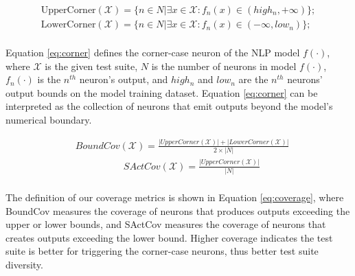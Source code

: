 \begin{equation}
\begin{split}
    \text{UpperCorner}(\mathcal{X}) = \{n \in N | \exists x \in \mathcal{X}: f_n(x) \in (high_n, +\infty)\}; \\
    \text{LowerCorner}(\mathcal{X}) = \{n \in N | \exists x \in \mathcal{X}: f_n(x) \in (-\infty, low_n)\}; \\
\end{split}
    \label{eq:corner}
\end{equation}

\noindent Equation \ref{eq:corner} defines the corner-case neuron of
the NLP model $f(\cdot)$, where $\mathcal{X}$ is the given test suite,
$N$ is the number of neurons in model $f(\cdot)$, $f_n(\cdot)$ is the
$n^{th}$ neuron's output, and $high_n$ and $low_n$ are the $n^{th}$
neurons' output bounds on the model training dataset.  Equation
\ref{eq:corner} can be interpreted as the collection of neurons that
emit outputs beyond the model's numerical boundary.

\begin{equation}
\begin{split}
     & BoundCov(\mathcal{X}) = \frac{|UpperCorner(\mathcal{X})| + |LowerCorner(\mathcal{X})| }{2 \times |N|} \\ 
     &\quad  \qquad \qquad  SActCov(\mathcal{X}) = \frac{|UpperCorner(\mathcal{X})|} {|N|} \\ 
\end{split}
    \label{eq:coverage}
\end{equation}

\noindent The definition of our coverage metrics is shown in Equation
\ref{eq:coverage}, where BoundCov measures the coverage of neurons
that produces outputs exceeding the upper or lower bounds, and SActCov
measures the coverage of neurons that creates outputs exceeding the
lower bound.  Higher coverage indicates the test suite is better for
triggering the corner-case neurons, thus better test suite diversity.



